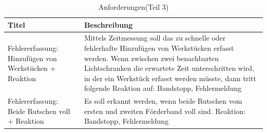 \documentclass[a4paper, 11pt]{article}
\begin{document}
\newpage

\begin{table}[h]
\center
\begin{tabularx}{\textwidth}{|X|X|}
\hline
\textbf{Titel}&\textbf{Beschreibung}\\
\hline
Fehlererfassung: Hinzufügen von Werkstücken + Reaktion&Mittels Zeitmessung soll das zu schnelle oder fehlerhafte Hinzufügen von Werkstücken erfasst werden. Wenn zwischen zwei benachbarten Lichtschranken die erwartete Zeit unterschritten wird, in der ein Werkstück erfasst werden müsste, dann tritt folgende Reaktion auf: Bandstopp, Fehlermeldung \\
\hline
Fehlererfassung: Beide Rutschen voll + Reaktion&Es soll erkannt werden, wenn beide Rutschen vom ersten und zweiten Förderband voll sind. Reaktion: Bandstopp, Fehlermeldung \\
\hline
\end{tabularx}
\caption{Anforderungen(Teil 3)}
\label{anf3}
\end{table}
\end{document}
